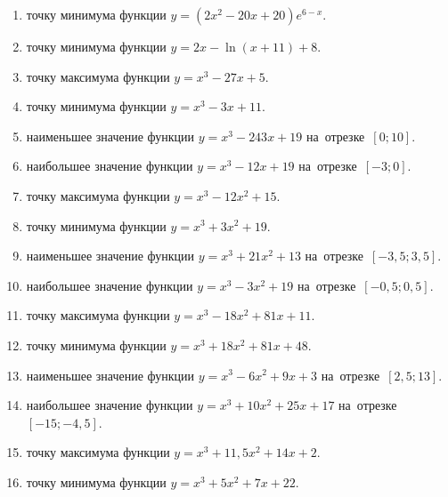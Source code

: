 \documentclass[a4paper,10pt]{article}
\begin{document}
\begin{enumerate}
\item {} точку минимума функции $y=\left(2x^2-20x+20\right){{e}^{6-x}}$.

\item {} точку минимума функции $y=2x-\ln \left(x+11\right)+8$.

\item {} точку максимума функции $y=x^3 -27x +5$.

\item {} точку минимума функции $y=x^3 -3x+11$.

\item {} наименьшее значение функции $y=x^3 -243x+19$ на~отрезке~$\left[0;10\right]$.

\item {} наибольшее значение функции $y=x^3 -12x+19$ на~отрезке~$\left[-3;0\right]$.

\item {} точку максимума функции $y=x^3 -12x^2+15$.

\item {} точку минимума функции $y=x^3 +3x^2+19$.

\item {} наименьшее значение функции $y=x^3 +21x^2+13$ на~отрезке~$\left[-3,5;3,5\right]$.

\item {} наибольшее значение функции $y=x^3 -3x^2+19$ на~отрезке~$\left[-0,5;0,5\right]$.

\item {} точку максимума функции $y=x^3 -18x^2+81x+11$.

\item {} точку минимума функции $y=x^3 +18x^2+81x+48$.

\item {} наименьшее значение функции $y=x^3 -6x^2+9x+3$ на~отрезке~$\left[2,5;13\right]$.

\item {} наибольшее значение функции $y=x^3 +10x^2+25x+17$ на~отрезке~$\left[-15;-4,5\right]$.

\item {} точку максимума функции $y=x^3 +11,5x^2+14x+2$.

\item {} точку минимума функции $y=x^3 +5x^2+7x+22$.


\end{enumerate}
\end{document}
